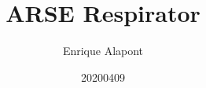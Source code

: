 \documentclass[two column, oneside]{article}
\title{ARSE Respirator}
\author{Enrique Alapont}
\date{20200409}
\begin{document}
 
    \maketitle
    
    
    
    
    
    
    
    
    
    \clearpage
    \listoffigures
    
    
    
    \onecolumn
    \appendix
    \appendixpage
    
    
\end{document}

